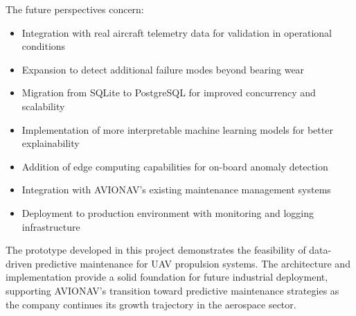 The future perspectives concern:
\begin{itemize}
    \item Integration with real aircraft telemetry data for validation in operational conditions
    \item Expansion to detect additional failure modes beyond bearing wear
    \item Migration from SQLite to PostgreSQL for improved concurrency and scalability
    \item Implementation of more interpretable machine learning models for better explainability
    \item Addition of edge computing capabilities for on-board anomaly detection
    \item Integration with AVIONAV's existing maintenance management systems
    \item Deployment to production environment with monitoring and logging infrastructure
\end{itemize}

The prototype developed in this project demonstrates the feasibility of data-driven predictive maintenance for UAV propulsion systems. The architecture and implementation provide a solid foundation for future industrial deployment, supporting AVIONAV's transition toward predictive maintenance strategies as the company continues its growth trajectory in the aerospace sector.
